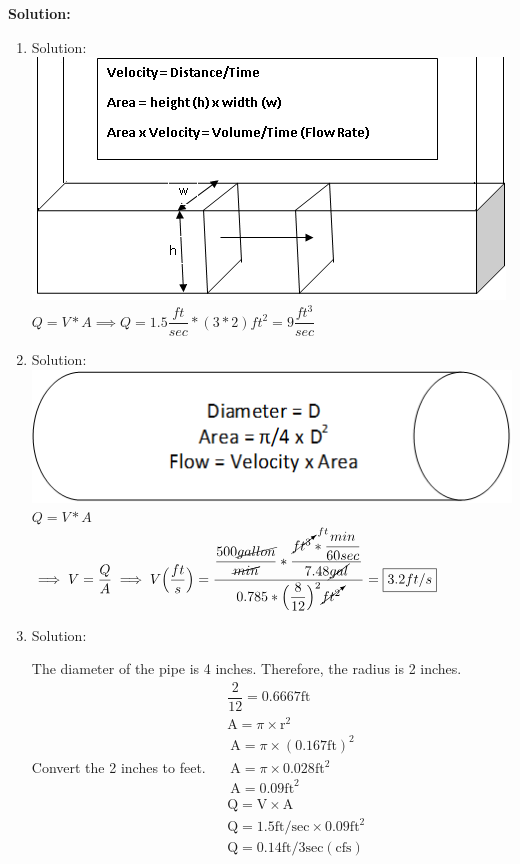 \documentclass{article}
\begin{document}
\textbf{Solution:}\\

\begin{enumerate}

\item Solution:\\
\includegraphics[scale=0.5]{ChannelFlow3}\\
$Q=V*A \implies Q = 1.5 \dfrac{ft}{sec}*(3*2)ft^2=\boxed{9\dfrac{ft^3}{sec}}$

\item Solution:\\
\vspace{0.5cm}
\includegraphics[scale=0.5]{PipeFlow}\\
$Q=V*A$\\
$\implies V=\dfrac{Q}{A} \implies V \Big(\dfrac{ft}{s}\Big)= \dfrac{\dfrac{500\cancel{gallon}}{\cancel{min}}*\dfrac{\cancelto{ft}{ft^3}*\dfrac{min}{60sec}}{7.48\cancel{gal}}}{0.785*\Big(\dfrac{8}{12}\Big)^2\cancelto{}{ft^2}}=\boxed{3.2ft/s}$

\item Solution:\\

\vspace{0.5cm}

The diameter of the pipe is 4 inches. Therefore, the radius is 2 inches. Convert the 2 inches to feet.
$
\begin{aligned}
&\dfrac{2}{12}=0.6667 \mathrm{ft} \\
&\mathrm{A}=\pi \times \mathrm{r}^{2} \\
&\mathrm{~A}=\pi \times(0.167 \mathrm{ft})^{2} \\
&\mathrm{~A}=\pi \times 0.028 \mathrm{ft}^{2} \\
&\mathrm{~A}=0.09 \mathrm{ft}^{2} \\
&\mathrm{Q}=\mathrm{V} \times \mathrm{A} \\
&\mathrm{Q}=1.5 \mathrm{ft} / \mathrm{sec} \times 0.09 \mathrm{ft}^{2} \\
&\mathrm{Q}=0.14 \mathrm{ft} / 3 \mathrm{sec}(\mathrm{cfs})
\end{aligned}
$




\end{enumerate}
\end{document}
